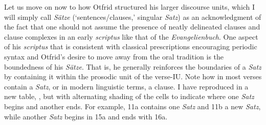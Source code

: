 Let us move on now to how Otfrid structured his larger discourse units, which I will simply call \textit{Sätze} (‘sentences/clauses,’ singular \textit{Satz}) as an acknowledgment of the fact that one should not assume the presence of neatly delineated clauses and clause complexes in an early \textit{scriptus} like that of the \textit{Evangelienbuch}. One aspect of his \textit{scriptus} that is consistent with classical prescriptions encouraging periodic syntax and Otfrid’s desire to move away from the oral tradition is the boundedness of his \textit{Sätze}. That is, he generally reinforces the boundaries of a \textit{Satz} by containing it within the prosodic unit of the verse-IU. Note how in  most verses contain a \textit{Satz}, or in modern linguistic terms, a clause. I have reproduced  in a new table, , but with alternating shading of the cells to indicate where one \textit{Satz} begins and another ends. For example, 11a contains one \textit{Satz} and 11b a new \textit{Satz}, while another \textit{Satz} begins in 15a and ends with 16a.

